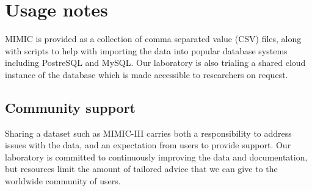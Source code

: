 \documentclass[english]{article}
\begin{document}

\section*{Usage notes}



MIMIC is provided as a collection of comma separated value (CSV) files, along with scripts to help with importing the data into popular database systems including PostreSQL and MySQL. Our laboratory is also trialing a shared cloud instance of the database which is made accessible to researchers on request. 

\subsection*{Community support}

Sharing a dataset such as MIMIC-III carries both a responsibility to address issues with the data, and an expectation from users to provide support. Our laboratory is committed to continuously improving the data and documentation, but resources limit the amount of tailored advice that we can give to the worldwide community of users.
\end{document}
